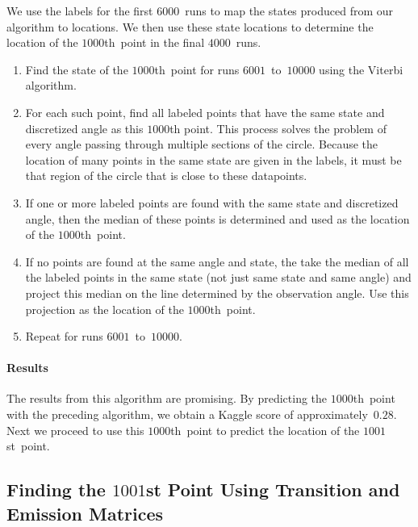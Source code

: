 \documentclass[twoside]{article}
\begin{document}
We use the labels for the first $\num{6000}$~runs to map the states produced from our algorithm to locations.
We then use these state locations to determine the location of the $\num{1000}$th~point in the final $\num{4000}$~runs.
\begin{enumerate}
\item Find the state of the $\num{1000}$th~point for runs $\num{6001}$~to~$\num{10000}$ using the Viterbi algorithm.
\item For each such point, find all labeled points that have the same state and discretized angle as this $\num{1000}$th point.
  This process solves the problem of every angle passing through multiple sections of the circle.
  Because the location of many points in the same state are given in the labels, it must be that region of the circle that is close to these datapoints.
\item If one or more labeled points are found with the same state and discretized angle, then the median of these points is determined and used as the location of the $\num{1000}$th~point.
\item If no points are found at the same angle and state, the take the median of all the labeled points in the same state (not just same state and same angle) and project this median on the line determined by the observation angle.
  Use this projection as the location of the $\num{1000}$th~point.
\item Repeat for runs $\num{6001}$~to~$\num{10000}$.
\end{enumerate}

\paragraph{Results}

The results from this algorithm are promising.
By predicting the $\num{1000}$th~point with the preceding algorithm, we obtain a Kaggle score of approximately~$0.28$.
Next we proceed to use this $\num{1000}$th~point to predict the location of the $\num{1001}$st~point.

\subsection{Finding the $\num{1001}$st Point Using Transition and Emission Matrices}\label{sec:find-num1001st-point}
\end{document}
